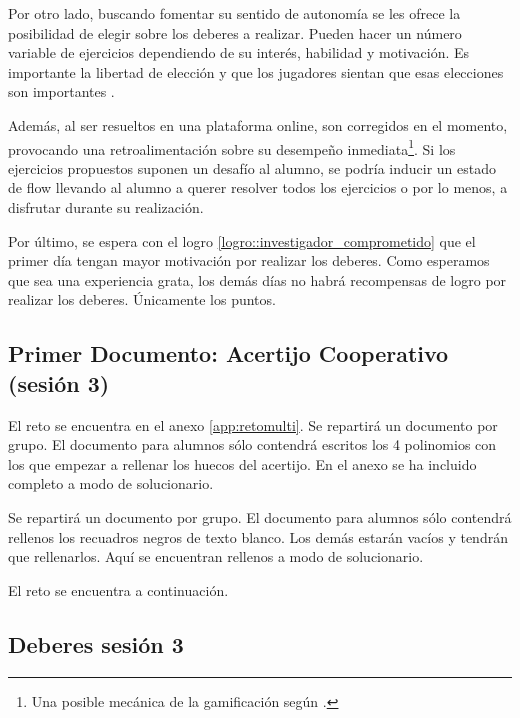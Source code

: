	Por otro lado, buscando fomentar su sentido de autonomía se les ofrece la posibilidad de elegir sobre los deberes a realizar. 
	Pueden hacer un número variable de ejercicios dependiendo de su interés, habilidad y motivación.
	Es importante la libertad de elección y que los jugadores sientan que esas elecciones son importantes \citep{werbach2012win}.

	Además, al ser resueltos en una plataforma online, son corregidos en el momento, provocando una retroalimentación sobre su desempeño inmediata\footnote{Una posible mecánica de la gamificación según \citeauthor{werbach2012win}.}.
	Si los ejercicios propuestos suponen un desafío al alumno, se podría inducir un estado de flow llevando al alumno a querer resolver todos los ejercicios o por lo menos, a disfrutar durante su realización.

	Por último, se espera con el logro \ref{logro::investigador_comprometido} que el primer día tengan mayor motivación por realizar los deberes.
	Como esperamos que sea una experiencia grata, los demás días no habrá recompensas de logro por realizar los deberes. 
	Únicamente los puntos.


\subsection{Primer Documento: Acertijo Cooperativo (sesión 3)}
\label{app:ses3:coop}



\ifinapp
	El reto se encuentra en el anexo \ref{app:retomulti}.
	Se repartirá un documento por grupo. 
	El documento para alumnos sólo contendrá escritos los 4 polinomios con los que empezar a rellenar los huecos del acertijo.
	En el anexo se ha incluido completo a modo de solucionario.

\else 
	Se repartirá un documento por grupo. 
	El documento para alumnos sólo contendrá rellenos los recuadros negros de texto blanco.
	Los demás estarán vacíos y tendrán que rellenarlos.
	Aquí se encuentran rellenos a modo de solucionario.

	El reto se encuentra a continuación.
	
\fi




\subsection{Deberes sesión 3}
\label{app:ses3:deberes}

